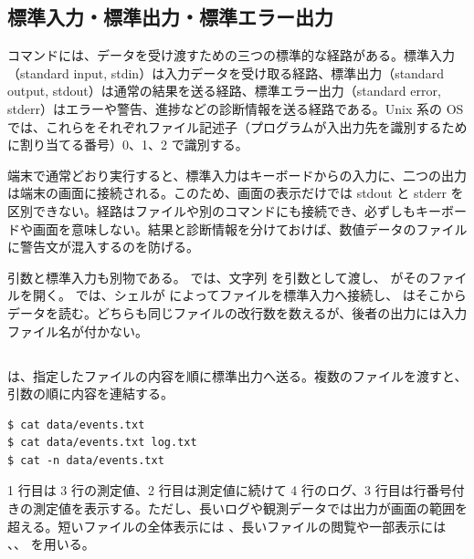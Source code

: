 \subsection{標準入力・標準出力・標準エラー出力}
\label{sec:standard-streams}

コマンドには、データを受け渡すための三つの標準的な経路がある。標準入力（standard input, stdin）は入力データを受け取る経路、標準出力（standard output, stdout）は通常の結果を送る経路、標準エラー出力（standard error, stderr）はエラーや警告、進捗などの診断情報を送る経路である。Unix 系の OS では、これらをそれぞれファイル記述子（プログラムが入出力先を識別するために割り当てる番号）0、1、2 で識別する。

端末で通常どおり実行すると、標準入力はキーボードからの入力に、二つの出力は端末の画面に接続される。このため、画面の表示だけでは stdout と stderr を区別できない。経路はファイルや別のコマンドにも接続でき、必ずしもキーボードや画面を意味しない。結果と診断情報を分けておけば、数値データのファイルに警告文が混入するのを防げる。

引数と標準入力も別物である。 では、文字列  を引数として渡し、 がそのファイルを開く。 では、シェルが \code{<} によってファイルを標準入力へ接続し、 はそこからデータを読む。どちらも同じファイルの改行数を数えるが、後者の出力には入力ファイル名が付かない。

\subsection{}

 は、指定したファイルの内容を順に標準出力へ送る。複数のファイルを渡すと、引数の順に内容を連結する。

\begin{lstlisting}[numbers=none, xleftmargin=2\zw]
$ cat data/events.txt
$ cat data/events.txt log.txt
$ cat -n data/events.txt
\end{lstlisting}

1 行目は 3 行の測定値、2 行目は測定値に続けて 4 行のログ、3 行目は行番号付きの測定値を表示する。ただし、長いログや観測データでは出力が画面の範囲を超える。短いファイルの全体表示には 、長いファイルの閲覧や一部表示には 、、 を用いる。

